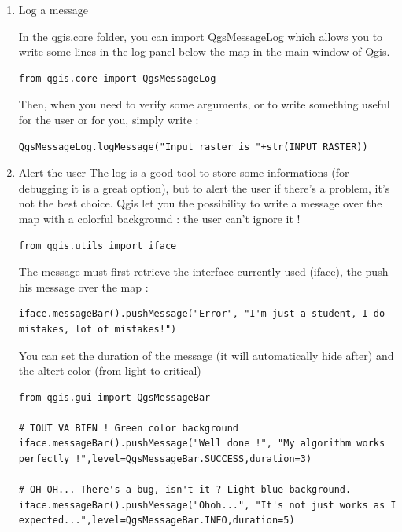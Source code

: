 \documentclass[a4paper,11pt,DIV=18]{scrartcl}
\begin{document}
\begin{enumerate}
\item Log a message
\label{sec:orge4fe192}

In the qgis.core folder, you can import QgsMessageLog which allows you to write some lines in the log panel below the map in the main window of Qgis.

\begin{verbatim}
from qgis.core import QgsMessageLog
\end{verbatim}

Then, when you need to verify some arguments, or to write something useful for
the user or for you, simply write :
\begin{verbatim}
QgsMessageLog.logMessage("Input raster is "+str(INPUT_RASTER))
\end{verbatim}

\item Alert the user
\label{sec:org579b61c}
The log is a good tool to store some informations (for debugging it is a great
option), but to alert the user if there's a problem, it's not the best choice.
Qgis let you the possibility to write a message over the map with a colorful background : the user can't ignore it !
\begin{verbatim}
from qgis.utils import iface
\end{verbatim}
The message must first retrieve the interface currently used (iface), the push
his message over the map :
\begin{verbatim}
iface.messageBar().pushMessage("Error", "I'm just a student, I do mistakes, lot of mistakes!")
\end{verbatim}
You can set the duration of the message (it will automatically hide after) and the altert color (from light to critical)

\begin{verbatim}
from qgis.gui import QgsMessageBar

# TOUT VA BIEN ! Green color background
iface.messageBar().pushMessage("Well done !", "My algorithm works perfectly !",level=QgsMessageBar.SUCCESS,duration=3)

# OH OH... There's a bug, isn't it ? Light blue background.
iface.messageBar().pushMessage("Ohoh...", "It's not just works as I expected...",level=QgsMessageBar.INFO,duration=5)


\end{verbatim}
\end{enumerate}
\end{document}
